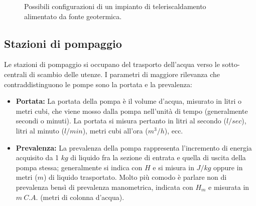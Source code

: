 \documentclass[laurea,oneside,11pt]{USiena_tesiLM3}
\begin{document}
 \begin{figure}[!ht]
 \centering
 \hspace{5mm}
 \caption{Possibili configurazioni di un impianto di teleriscaldamento alimentato da fonte geotermica.}
 \end{figure}

\subsection{Stazioni di pompaggio}
Le stazioni di pompaggio si occupano del trasporto dell'acqua verso le sotto-centrali di scambio delle utenze.
I parametri di maggiore rilevanza che contraddistinguono le pompe sono la portata e la prevalenza:
\begin{itemize}
\item \textbf{Portata:} La portata della pompa è il volume d'acqua, misurato in litri o metri cubi, che viene mosso dalla pompa nell'unità di tempo (generalmente secondi o minuti). La portata si misura pertanto in litri al secondo ($l/sec$), litri al minuto ($l/min$), metri cubi all'ora ($m^3/h$), ecc.
\item \textbf{Prevalenza:} La prevalenza della pompa rappresenta l'incremento di energia acquisito da 1 $kg$ di liquido fra la sezione di entrata e quella di uscita della pompa stessa; generalmente si indica con $H$ e si misura in $J/kg$ oppure in metri ($m$) di liquido trasportato. Molto più comodo è parlare non di prevalenza bensì di prevalenza manometrica, indicata con $H_m$ e misurata in $m \ C.A.$ (metri di colonna d'acqua).
\end{itemize}
\end{document}
